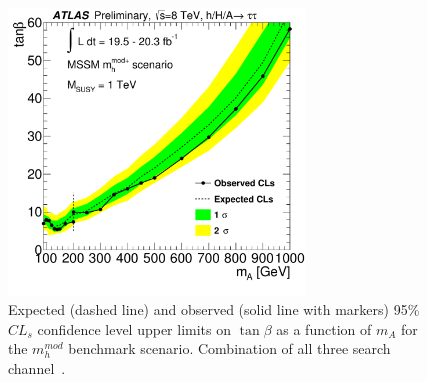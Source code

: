 \begin{figure}[!t]
     \begin{center}
            \includegraphics[width=0.70\textwidth]{figure/paper/limit_comb_2d_mhmodp.pdf}
    \end{center}

  \caption{ Expected (dashed line) and observed (solid line with markers) 95\%  $CL_s$ confidence level upper limits on $\tan\beta$ as a function of $m_A$
	for the $m_h^{mod}$ benchmark scenario. Combination of all three search channel~\cite{yuppy}.}
\label{fig:comball}
\end{figure}

